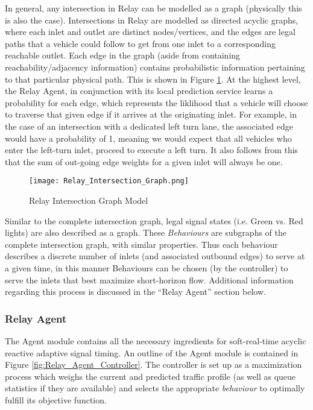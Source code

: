 \documentclass{article}
\begin{document}
In general, any intersection in Relay can be modelled as a graph (physically this is also the case).
Intersections in Relay are modelled as directed acyclic graphs, where each inlet and outlet are distinct nodes/vertices, and the edges are legal paths that a vehicle could follow to get from one inlet to a corresponding reachable outlet.
Each edge in the graph (aside from containing reachability/adjacency information) contains probabilistic information pertaining to that particular physical path.
This is shown in Figure \ref{fig:Relay_Intersection_Graph}.
At the highest level, the Relay Agent, in conjunction with its local prediction service learns a probability for each edge, which represents the liklihood that a vehicle will choose to traverse that given edge if it arrives at the originating inlet.
For example, in the case of an intersection with a dedicated left turn lane, the associated edge would have a probability of 1, meaning we would expect that all vehicles who enter the left-turn inlet, proceed to execute a left turn.
It also follows from this that the sum of out-going edge weights for a given inlet will always be one.\\

\begin{figure}[!ht]
	\caption{Relay Intersection Graph Model}
	\texttt{[image: Relay\_Intersection\_Graph.png]}
	\label{fig:Relay_Intersection_Graph}
\end{figure}

Similar to the complete intersection graph, legal signal states (i.e. Green vs. Red lights) are also described as a graph.
These \emph{Behaviours} are subgraphs of the complete intersection graph, with similar properties.
Thus each behaviour describes a discrete number of inlets (and associated outbound edges) to serve at a given time, in this manner Behaviours can be chosen (by the controller) to serve the inlets that best maximize short-horizon flow.
Additional information regarding this process is discussed in the ``Relay Agent'' section below.\\

\subsubsection{Relay Agent}
The Agent module contains all the necessary ingredients for soft-real-time acyclic reactive adaptive signal timing.
An outline of the Agent module is contained in Figure \ref{fig:Relay_Agent_Controller}.
The controller is set up as a maximization process which weighs the current and predicted traffic profile (as well as queue statistics if they are available) and selects the appropriate \emph{behaviour} to optimally fulfill its objective function.\\
\end{document}
